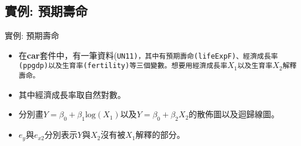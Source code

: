 \documentclass[xcolor=dvipsnames]{beamer}
\begin{document}
\subsection{實例: 預期壽命}
\begin{frame}{實例: 預期壽命}
\begin{itemize}
\item 在\textbf{car}套件中，有一筆資料(\tt{UN11})，其中有預期壽命(\tt{lifeExpF})、經濟成長率(\tt{ppgdp})以及生育率(\tt{fertility})等三個變數。想要用經濟成長率$X_{1}$以及生育率$X_{2}$解釋壽命。
\item 其中經濟成長率取自然對數。
\item 分別畫$Y=\beta_{0}+\beta_{1}\textrm{log}(X_{1})$以及$Y=\beta_{0}+\beta_{2}X_{2}$的散佈圖以及迴歸線圖。
\item $e_{y}$與$e_{x2}$分別表示$Y$與$X_{2}$沒有被$X_{1}$解釋的部分。
\end{itemize}
\end{frame}
\end{document}
